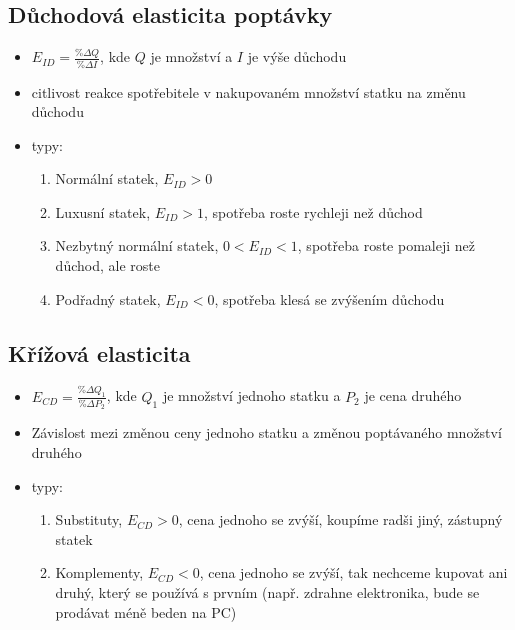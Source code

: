 \subsection{Důchodová elasticita poptávky}
\begin{itemize}
    \item $E_{ID}=\frac{\% \Delta Q}{\% \Delta I}$, kde $Q$ je množství a $I$ je výše důchodu
    \item citlivost reakce spotřebitele v nakupovaném množství statku na změnu důchodu
    \item typy:
    \begin{enumerate}
        \item Normální statek, $E_{ID}>0$
        \item Luxusní statek, $E_{ID}>1$, spotřeba roste rychleji než důchod
        \item Nezbytný normální statek, $0<E_{ID}<1$, spotřeba roste pomaleji než důchod, ale roste
        \item Podřadný statek, $E_{ID}<0$, spotřeba klesá se zvýšením důchodu
    \end{enumerate}
\end{itemize}

\subsection{Křížová elasticita}
\begin{itemize}
    \item $E_{CD}=\frac{\% \Delta Q_1}{\% \Delta P_2}$, kde $Q_1$ je množství jednoho statku a $P_2$ je cena druhého
    \item Závislost mezi změnou ceny jednoho statku a změnou poptávaného množství druhého
    \item typy:
    \begin{enumerate}
        \item Substituty, $E_{CD}>0$, cena jednoho se zvýší, koupíme radši jiný, zástupný statek
        \item Komplementy, $E_{CD}<0$, cena jednoho se zvýší, tak nechceme kupovat ani druhý,
        který se používá s prvním (např. zdrahne elektronika, bude se prodávat méně beden na PC)
    \end{enumerate}
\end{itemize}
